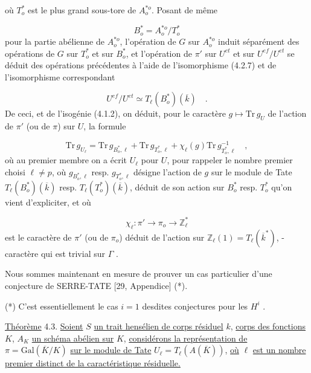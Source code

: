 
où $T^{*}_{o}$ est le plus grand sous-tore de $A^{*o}_{o}$. Posant de même

\begin{equation}\tag{4.2.8}
B^{*}_{o} = A^{*o}_{o}/T^{*}_{o}
\end{equation}
pour la partie abélienne de $A^{*o}_{o}$, l'opération de $G$ sur $A^{*o}_{o}$ induit séparément des opérations de $G$ sur $T^{*}_{o}$ et sur $B^{*}_{o}$, et l'opération de $\pi'$ sur $U^{et}$ et sur $U^{ef}/U^{et}$ se déduit des opérations précédentes à l'aide de l'isomorphisme (4.2.7) et de l'isomorphisme correspondant

\begin{equation}\tag{4.2.9}
U^{ef}/U^{et} \simeq T_{\ell}(B^{*}_{o})(\overline{k}) \quad .
\end{equation}
De ceci, et de l'isogénie (4.1.2), on déduit, pour le caractère $g \longmapsto \mathrm{Tr}\, g_{U}$ de l'action de $\pi'$ (ou de $\pi$) sur $U$, la formule

\begin{equation}\tag{4.2.10}
\mathrm{Tr}\, g_{U_{\ell}} = \mathrm{Tr}\, g_{B^{*}_{o},\ell} + \mathrm{Tr}\, g_{T^{*}_{o},\ell} + \chi_{\ell}(g)\mathrm{Tr}\, g^{-1}_{T^{*}_{o},\ell} \quad ,
\end{equation}
où au premier membre on a écrit $U_{\ell}$ pour $U$, pour rappeler le nombre premier choisi $\ell \neq p$, où $g_{B^{*}_{o},\ell}$ resp. $g_{T^{*}_{o},\ell}$ désigne l'action de $g$ sur le module de Tate $T_{\ell}(B^{*}_{o})(\overline{k})$ resp. $T_{\ell}(T^{*}_{o})(\overline{k})$, déduit de son action sur $B^{*}_{o}$ resp. $T^{*}_{o}$ qu'on vient d'expliciter, et où

\begin{equation}\tag{4.2.11}
\chi_{\ell} : \pi' \longrightarrow \pi_{o} \longrightarrow \mathbb{Z}^{*}_{\ell}
\end{equation}
est le caractère de $\pi'$ (ou de $\pi_{o}$) déduit de l'action sur $\mathbb{Z}_{\ell}(1) = T_{\ell}(\overline{k}^{*})$, - caractère qui est trivial sur $\Gamma$ .

Nous sommes maintenant en mesure de prouver un cas particulier d'une conjecture de SERRE-TATE [29, Appendice] (*).

(*) C'est essentiellement le cas $i=1$ desdites conjectures pour les $H^{i}$ .



\underline{Théorème} 4.3. \underline{Soient} $S$ \underline{un trait hensélien de corps résiduel} $k$, \underline{corps des fonctions} $K$, $A_K$ \underline{un schéma abélien sur} $K$, \underline{considérons la représentation de} $\pi = \mathrm{Gal}(\overline{K}/K)$ \underline{sur le module de Tate} $U_\ell = T_\ell(A(\overline{K}))$, \underline{où} $\ell$ \underline{est un nombre premier distinct de la caractéristique résiduelle.}

